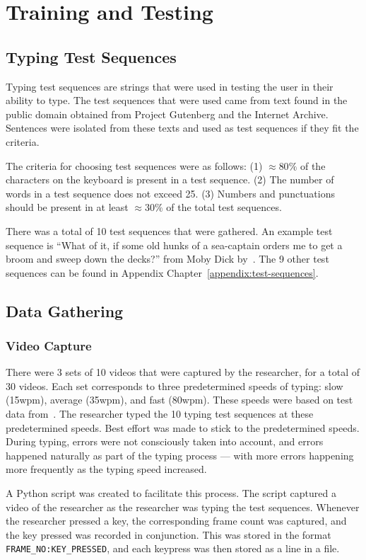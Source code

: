 \documentclass{report}
\begin{document}
\section{Training and Testing}

\subsection{Typing Test Sequences}
Typing test sequences are strings that were used in testing the user in their
ability to type. The test sequences that were used came from text found in the
public domain obtained from Project Gutenberg and the Internet Archive.
Sentences were isolated from these texts and used as test sequences if they fit
the criteria.

The criteria for choosing test sequences were as follows: (1) $\approx80\%$ of
the characters on the keyboard is present in a test sequence. (2) The number of
words in a test sequence does not exceed 25. (3) Numbers and punctuations should
be present in at least $\approx30\%$ of the total test sequences.

There was a total of 10 test sequences that were gathered. An example test
sequence is ``What of it, if some old hunks of a sea-captain orders me to get a
broom and sweep down the decks?'' from Moby Dick by~\textcite{moby-dick}. The 9
other test sequences can be found in Appendix
Chapter~\ref{appendix:test-sequences}.

\subsection{Data Gathering}
\subsubsection{Video Capture}
There were 3 sets of 10 videos that were captured by the researcher, for a total
of 30 videos. Each set corresponds to three predetermined speeds of typing: slow
(15wpm), average (35wpm), and fast (80wpm). These speeds were based on test data
from~\textcite{keybr}. The researcher typed the 10 typing test sequences at
these predetermined speeds. Best effort was made to stick to the predetermined
speeds. During typing, errors were not consciously taken into account, and
errors happened naturally as part of the typing process --- with more errors
happening more frequently as the typing speed increased.

A Python script was created to facilitate this process. The script captured a
video of the researcher as the researcher was typing the test sequences.
Whenever the researcher pressed a key, the corresponding frame count was
captured, and the key pressed was recorded in conjunction. This was stored in
the format \texttt{FRAME\_NO:KEY\_PRESSED}, and each keypress was then stored as
a line in a file.
\end{document}

